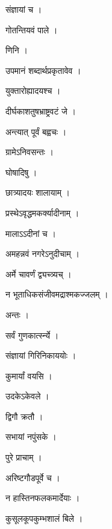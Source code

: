 \documentclass[10pt, openany]{book}
\begin{document}
\noindent संज्ञायां च ।

\noindent गोतन्तियवं पाले ।

\noindent णिनि ।

\noindent उपमानं शब्दार्थप्रकृतावेव ।

\noindent युक्तारोह्यादयश्च ।

\noindent दीर्घकाशतुषभ्राष्ट्रवटं जे ।

\noindent अन्त्यात् पूर्वं बह्वचः ।

\noindent ग्रामेऽनिवसन्तः ।

\noindent घोषादिषु ।

\noindent छात्र्यादयः शालायाम् ।

\noindent प्रस्थेऽवृद्धमकर्क्यादीनाम् ।

\noindent मालाऽऽदीनां च ।

\noindent अमहन्नवं नगरेऽनुदीचाम् ।

\noindent अर्मे चावर्णं द्व्यच्त्र्यच् ।

\noindent न भूताधिकसंजीवमद्राश्मकज्जलम् ।

\noindent अन्तः ।

\noindent सर्वं गुणकार्त्स्न्ये ।

\noindent संज्ञायां गिरिनिकाययोः ।

\noindent कुमार्यां वयसि ।

\noindent उदकेऽकेवले ।

\noindent द्विगौ क्रतौ ।

\noindent सभायां नपुंसके ।

\noindent पुरे प्राचाम् ।

\noindent अरिष्टगौडपूर्वे च ।

\noindent न हास्तिनफलकमार्देयाः ।

\noindent कुसूलकूपकुम्भशालं बिले ।
\end{document}
